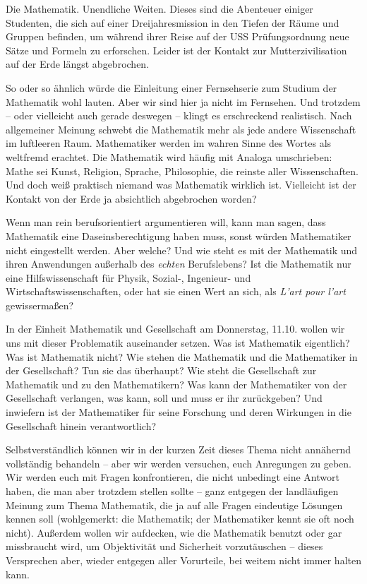 \label{page:mug}
Die Mathematik. Unendliche Weiten. Dieses sind die Abenteuer einiger
Studenten, die sich auf einer Dreijahresmission in den Tiefen der Räume und
Gruppen befinden, um während ihrer Reise auf der USS Prüfungsordnung neue Sätze
und Formeln zu erforschen. Leider ist der Kontakt zur Mutterzivilisation auf
der Erde längst abgebrochen.

So oder so ähnlich würde die Einleitung einer Fernsehserie zum Studium der
Mathematik wohl lauten. Aber wir sind hier ja nicht im Fernsehen. Und trotzdem
-- oder vielleicht auch gerade deswegen -- klingt es erschreckend realistisch.
Nach allgemeiner Meinung schwebt die Mathematik mehr als jede andere
Wissenschaft im luftleeren Raum. Mathematiker werden im wahren Sinne des Wortes
als weltfremd erachtet. Die Mathematik wird häufig mit Analoga umschrieben:
Mathe sei Kunst, Religion, Sprache, Philosophie, die reinste aller
Wissenschaften. Und doch weiß praktisch niemand was Mathematik wirklich ist.
Vielleicht ist der Kontakt von der Erde ja absichtlich abgebrochen worden?

Wenn man rein berufsorientiert argumentieren will, kann man sagen, dass
Mathematik eine Daseinsberechtigung haben muss, sonst würden Mathematiker nicht
eingestellt werden. Aber welche? Und wie steht es mit der Mathematik und ihren
Anwendungen außerhalb des \emph{echten} Berufslebens? Ist die Mathematik nur
eine Hilfswissenschaft für Physik, Sozial-, Ingenieur- und
Wirtschaftswissenschaften, oder hat sie einen Wert an sich, als \emph{L'art
pour l'art} gewissermaßen?

In der Einheit Mathematik und Gesellschaft am Donnerstag, 11.10. wollen wir uns
mit dieser Problematik auseinander setzen. Was ist Mathematik eigentlich? Was
ist Mathematik nicht? Wie stehen die Mathematik und die Mathematiker in der
Gesellschaft? Tun sie das überhaupt? Wie steht die Gesellschaft zur Mathematik
und zu den Mathematikern? Was kann der Mathematiker von der Gesellschaft
verlangen, was kann, soll und muss er ihr zurückgeben? Und inwiefern ist der
Mathematiker für seine Forschung und deren Wirkungen in die Gesellschaft hinein
verantwortlich?

Selbstverständlich können wir in der kurzen Zeit dieses Thema nicht annähernd
vollständig behandeln -- aber wir werden versuchen, euch Anregungen zu geben.
Wir werden euch mit Fragen konfrontieren, die nicht unbedingt eine Antwort
haben, die man aber trotzdem stellen sollte -- ganz entgegen der landläufigen
Meinung zum Thema Mathematik, die ja auf alle Fragen eindeutige Lösungen kennen
soll (wohlgemerkt: die Mathematik; der Mathematiker kennt sie oft noch nicht).
Außerdem wollen wir aufdecken, wie die Mathematik benutzt oder gar missbraucht
wird, um Objektivität und Sicherheit vorzutäuschen -- dieses Versprechen aber,
wieder entgegen aller Vorurteile, bei weitem nicht immer halten kann.

